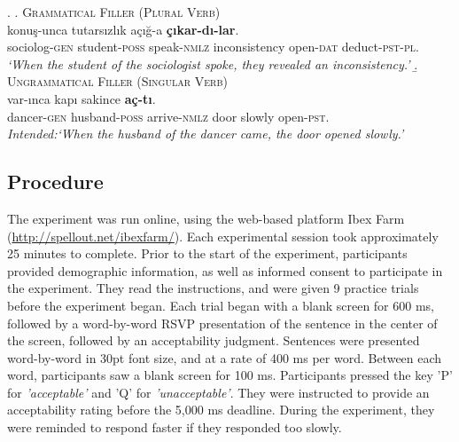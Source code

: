 \documentclass[doc,a4paper,man,natbib,floatsintext,noextraspace]{apa6}
\begin{document}


\ex. \label{item:exp1FillerItems}
%
\a. \label{item:exp1GrammaticalFiller} \textsc{Grammatical Filler (Plural Verb)}\\ 
   konuş-unca tutarsızlık açığ-a \textbf{çıkar-dı-lar}.\\ %
  sociolog-\textsc{gen}  student-\textsc{poss} speak-\textsc{nmlz} inconsistency  open-\textsc{dat} deduct-\textsc{pst}-\textsc{pl}.\\
  \glt \textit{`When the student of the sociologist spoke, they revealed an inconsistency.'}
%
%
\b. \textsc{Ungrammatical Filler (Singular Verb)}\\ 
 var-ınca kapı sakince \textbf{aç-tı}.\\ 
dancer-\textsc{gen}  husband-\textsc{poss} arrive-\textsc{nmlz} door slowly  open-\textsc{pst}.\\
\glt \textit{Intended:`When the husband of the dancer came, the door opened slowly.'}

\subsection{Procedure} \label{sec:exp1:procedure}

The experiment was run online, using the web-based platform Ibex Farm (\url{http://spellout.net/ibexfarm/}). Each experimental session took approximately 25 minutes to complete.
%
Prior to the start of the experiment, participants provided demographic information, as well as informed consent to participate in the experiment. They read the instructions, and were given 9 practice trials before the experiment began.
%
Each trial began with a blank screen for 600 ms, followed by a word-by-word RSVP presentation of the sentence in the center of the screen, followed by an acceptability judgment. 
Sentences were presented word-by-word in 30pt font size, and at a rate of 400 ms per word. Between each word, participants saw a blank screen for 100 ms. Participants pressed the key 'P' for \textit{'acceptable'} and 'Q' for \textit{'unacceptable'}. They were instructed to provide an acceptability rating before the 5,000 ms deadline. During the experiment, they were reminded to respond faster if they responded too slowly. 
\end{document}
